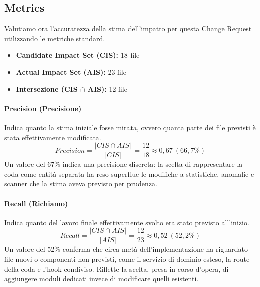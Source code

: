 \documentclass[11pt,a4paper,oneside,openany]{book}
\begin{document}
\subsection{Metrics}

Valutiamo ora l'accuratezza della stima dell'impatto per questa Change
Request utilizzando le metriche standard.
\begin{itemize}
  \item \textbf{Candidate Impact Set (CIS):} 18 file
  \item \textbf{Actual Impact Set (AIS):} 23 file
  \item \textbf{Intersezione (CIS $\cap$ AIS):} 12 file
\end{itemize}

\paragraph{Precision (Precisione)}
Indica quanto la stima iniziale fosse mirata, ovvero quanta parte dei file
previsti è stata effettivamente modificata.
\[ \mathit{Precision} = \frac{|\mathit{CIS} \cap \mathit{AIS}|}{|\mathit{CIS}|} = \frac{12}{18} \approx 0{,}67\ (66{,}7\%) \]
Un valore del 67\% indica una precisione discreta: la scelta di rappresentare
la coda come entità separata ha reso superflue le modifiche a statistiche,
anomalie e scanner che la stima aveva previsto per prudenza.

\paragraph{Recall (Richiamo)}
Indica quanto del lavoro finale effettivamente svolto era stato previsto
all'inizio.
\[ \mathit{Recall} = \frac{|\mathit{CIS} \cap \mathit{AIS}|}{|\mathit{AIS}|} = \frac{12}{23} \approx 0{,}52\ (52{,}2\%) \]
Un valore del 52\% conferma che circa metà dell'implementazione ha
riguardato file nuovi o componenti non previsti, come il servizio di dominio
esteso, la route della coda e l'hook condiviso. Riflette la scelta, presa in
corso d'opera, di aggiungere moduli dedicati invece di modificare quelli
esistenti.
\end{document}
